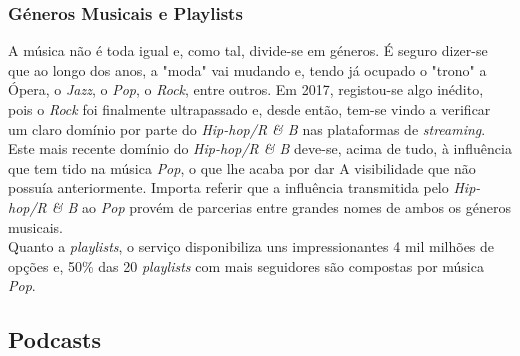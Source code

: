\subsubsection{Géneros Musicais e Playlists}

A música não é toda igual e, como tal, divide-se em géneros. É seguro dizer-se que ao longo dos anos, a "moda" vai mudando e, tendo já ocupado o "trono" a Ópera, o \textit{Jazz}, o \textit{Pop}, o \textit{Rock}, entre outros. Em 2017, registou-se algo inédito, pois o \textit{Rock} foi finalmente ultrapassado e, desde então, tem-se vindo a verificar um claro domínio por parte do \textit{Hip-hop/R \& B} nas plataformas de \textit{streaming}.\\
Este mais recente domínio do \textit{Hip-hop/R \& B} deve-se, acima de tudo, à influência que tem tido na música \textit{Pop}, o que lhe acaba por dar A visibilidade que não possuía anteriormente. Importa referir que a influência transmitida pelo \textit{Hip-hop/R \& B} ao \textit{Pop} provém de parcerias entre grandes nomes de ambos os géneros musicais.\\
Quanto a \textit{playlists}, o serviço disponibiliza uns impressionantes 4 mil milhões de opções e, 50\% das 20 \textit{playlists} com mais seguidores são compostas por música \textit{Pop}.


\subsection{Podcasts}

